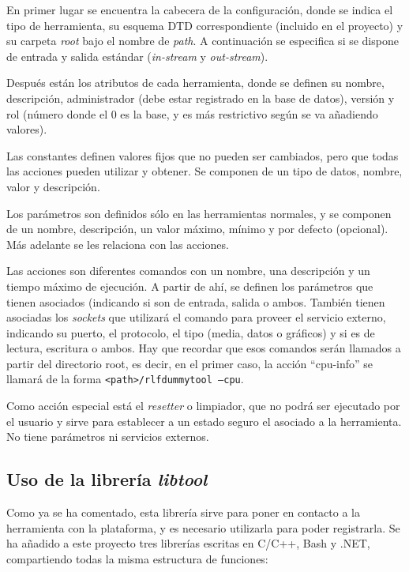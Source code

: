 En primer lugar se encuentra la cabecera de la configuración, donde se 
indica el tipo de herramienta, su esquema DTD correspondiente 
(incluido en el proyecto) y su carpeta \emph{root} bajo el nombre de 
\emph{path}. A continuación se especifica si se dispone de entrada y 
salida estándar (\emph{in-stream} y \emph{out-stream}).

Después están los atributos de cada herramienta, donde se definen su 
nombre, descripción, administrador (debe estar registrado en la base 
de datos), versión y rol (número donde el 0 es la base, y es más 
restrictivo según se va añadiendo valores).

Las constantes definen valores fijos que no pueden ser cambiados, pero 
que todas las acciones pueden utilizar y obtener. Se componen de un 
tipo de datos, nombre, valor y descripción.

Los parámetros son definidos sólo en las herramientas normales, y se 
componen de un nombre, descripción, un valor máximo, mínimo y por 
defecto (opcional). Más adelante se les relaciona con las acciones.

Las acciones son diferentes comandos con un nombre, una descripción y 
un tiempo máximo de ejecución. A partir de ahí, se definen los 
parámetros que tienen asociados (indicando si son de entrada, salida o 
ambos. También tienen asociadas los \emph{sockets} que utilizará el 
comando para proveer el servicio externo, indicando su puerto, el 
protocolo, el tipo (media, datos o gráficos) y si es de lectura, 
escritura o ambos. Hay que recordar que esos comandos serán llamados a 
partir del directorio root, es decir, en el primer caso, la acción ``cpu-info'' 
se llamará de la forma \texttt{<path>/rlfdummytool --cpu}.

Como acción especial está el \emph{resetter} o limpiador, que no 
podrá ser ejecutado por el usuario y sirve para establecer a un estado 
seguro el \hardware asociado a la herramienta. No tiene parámetros ni 
servicios externos.

\subsection*{Uso de la librería \emph{libtool}}
Como ya se ha comentado, esta librería sirve para poner en contacto a 
la herramienta con la plataforma, y es necesario utilizarla para poder 
registrarla. Se ha añadido a este proyecto tres librerías escritas en 
C/C++, Bash y .NET, compartiendo todas la misma estructura de funciones:

